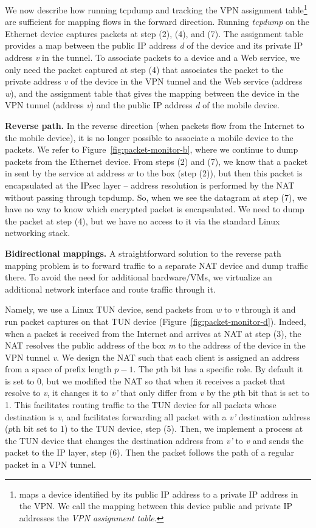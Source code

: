 We now describe how running tcpdump and tracking the VPN assignment
table\footnote{\platname{} maps a device identified by its public IP
  address to a private IP address in the VPN. We call the mapping
  between this device public and private IP addresses the \textit{VPN
    assignment table}.} are sufficient for mapping flows in the
forward direction. Running \emph{tcpdump} on the Ethernet device
captures packets at step (2), (4), and (7). The assignment table
provides a map between the public IP address \emph{d} of the device
and its private IP address \emph{v} in the tunnel. To associate
packets to a device and a Web service, we only need the packet
captured at step (4) that associates the packet to the private address
\emph{v} of the device in the VPN tunnel and the Web service (address
\emph{w}), and the assignment table that gives the mapping between the
device in the VPN tunnel (address \emph{v}) and the public IP address
\emph{d} of the mobile device.

\noindent \textbf{Reverse path.} In the reverse direction (when packets flow from the
Internet to the mobile device), it is no longer possible to associate a
mobile device to the packets. We refer to 
Figure~\ref{fig:packet-monitor-b}, where we continue to dump packets from 
the Ethernet device. From
steps (2) and (7), we know that a packet in sent by the service at address $w$ to
the \platname{} box (step (2)), but then this packet is encapsulated
at the IPsec layer -- address resolution is performed by the NAT
without passing through tcpdump. So, when we see the datagram at step (7), we have no
way to know which encrypted packet is encapsulated. We need to dump
the packet at step (4), but we have no access to it via the standard Linux networking stack. 

\noindent \textbf{Bidirectional mappings.} A straightforward solution to 
the reverse path mapping problem is to forward traffic to a separate NAT 
device and dump traffic there. To avoid the need for additional hardware/VMs,
we virtualize an additional network interface and route traffic through it. 

Namely, we use a Linux TUN device, send packets from \emph{w} to \emph{v} through 
it and run packet captures on that TUN device (Figure~\ref{fig:packet-monitor-d}). 
Indeed, when a packet is
received from the Internet and arrives at NAT at step
(3), the NAT resolves the public address of the
\platname{} box \emph{m} to the address of the device in the VPN
tunnel \emph{v}. We design the NAT such that each client is assigned an 
address from a space of prefix length $p-1$. The $p$th bit has a
specific role. By default it is set to 0, but we modified the NAT so
that when it receives a packet that resolve to \emph{v}, it changes it
to \emph{v'} that only differ from \emph{v} by the $p$th bit that is
set to 1. This facilitates routing traffic to the TUN device for all
packets whose destination is \emph{v}, and facilitates forwarding  
all packet with a \emph{v'} destination address ($p$th bit set
to 1) to the TUN device, step (5). Then, we implement a process at the
TUN device that changes the destination address
from \emph{v'} to \emph{v} and sends the packet to the IP
layer, step (6). Then the packet follows the path of a regular packet
in a VPN tunnel. 

